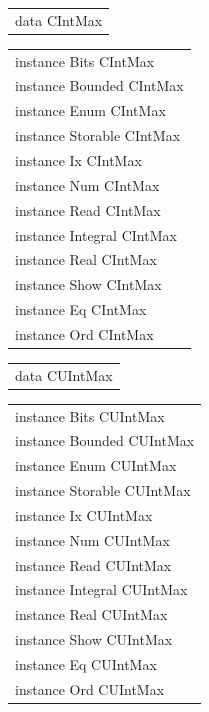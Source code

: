 \begin{haddockdesc}
\item[\begin{tabular}{@{}l}
data CIntMax
\end{tabular}]
\end{haddockdesc}
\begin{haddockdesc}
\item[\begin{tabular}{@{}l}
instance Bits CIntMax\\instance Bounded CIntMax\\instance Enum CIntMax\\instance Storable CIntMax\\instance Ix CIntMax\\instance Num CIntMax\\instance Read CIntMax\\instance Integral CIntMax\\instance Real CIntMax\\instance Show CIntMax\\instance Eq CIntMax\\instance Ord CIntMax
\end{tabular}]
\end{haddockdesc}
\begin{haddockdesc}
\item[\begin{tabular}{@{}l}
data CUIntMax
\end{tabular}]
\end{haddockdesc}
\begin{haddockdesc}
\item[\begin{tabular}{@{}l}
instance Bits CUIntMax\\instance Bounded CUIntMax\\instance Enum CUIntMax\\instance Storable CUIntMax\\instance Ix CUIntMax\\instance Num CUIntMax\\instance Read CUIntMax\\instance Integral CUIntMax\\instance Real CUIntMax\\instance Show CUIntMax\\instance Eq CUIntMax\\instance Ord CUIntMax
\end{tabular}]
\end{haddockdesc}
